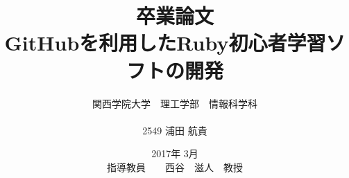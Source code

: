 \title{卒業論文\\
\vspace{4cm} GitHubを利用したRuby初心者学習ソフトの開発}
\author{ 関西学院大学　理工学部　情報科学科\\\\2549 浦田 航貴}
\date{\vspace{3cm} 2017年  3月\\
\vspace{3cm} 指導教員　　西谷　滋人　教授}
\maketitle
\tableofcontents

